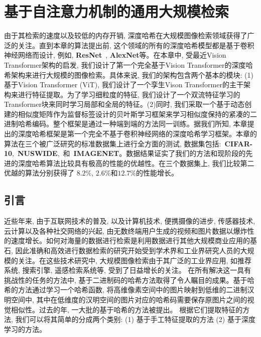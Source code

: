 \chapter{基于自注意力机制的通用大规模检索}
由于其检索的速度以及较低的内存开销, 深度哈希在大规模图像检索领域获得了广泛的关注。直到本章的算法提出前, 这个领域的所有的深度哈希模型都是基于卷积神经网络而设计, 例如, \textbf{ResNet}~\cite{he2016deep}, \textbf{AlexNet}等。在本章中, 受最近Vision Transformer架构的启发, 我们设计了第一个完全基于Vision Transformer的深度哈希架构来进行大规模的图像检索。具体来说, 我们的架构包含两个基本的模块: (1) 基于Vision Transformer (ViT), 我们设计了一个孪生Vison Transformer的主干架构来进行特征提取。为了学习细粒度的特征, 我们设计了一个双流特征学习的Transformer块来同时学习局部和全局的特征。(2)同时, 我们采取一个基于动态创建的相似度矩阵作为监督标签设计的贝叶斯学习框架来学习相似度保持的紧凑的二进制哈希编码。整个框架是通过一种端到端的方法同一训练。据我们所知, 本章提出的深度哈希框架是第一个完全不基于卷积神经网络的深度哈希学习框架。本章的算法在三个被广泛研究的标准数据集上进行全方面的测试, 数据集包括:~\textbf{CIFAR-10},~\textbf{NUSWIDE},~和~\textbf{IMAGENET}。数据结果证实了我们的方法和现阶段的先进的深度哈希算法比较具有极高的性能的优越性。在三个数据集上, 我们比较第二优越的算法分别获得了 $8.2\%$, $2.6 \%$和$12.7\%$的性能增长。

\section{引言}
近些年来, 由于互联网技术的普及, 以及计算机技术, 便携摄像的进步, 传感器技术, 云计算以及各种社交网络的兴起, 由无数终端用户生成的视频和图片数据以爆炸性的速度增长。如何对海量的数据进行检索是利用数据进行其他大规模商业应用的基石, 因此准确和高效进行数据检索的研究开始受到学术界和工业界研究人员的大规模的关注。在这些技术研究中, 大规模图像检索由于其广泛的工业界应用, 如推荐系统, 搜索引擎, 遥感检索系统等, 受到了日益增长的关注。 在所有解决这一具有挑战性的任务的方法中\cite{fu2017fast, ge2013optimized, jegou2010product, malkov2018efficient}, 基于二进制码的哈希方法取得了令人瞩目的成果。基于哈希的方法通过学习一个哈希函数, 将高维像素空间中的图片映射到低维的二进制汉明空间中, 其中在低维度的汉明空间的图片对应的哈希码需要保存原图片之间的视觉相似性。过去的年, 一大批的基于哈希的方法被提出。 根据它们提取特征的方法, 我们可以将其简单的分成两个类别: (1) 基于手工特征提取的方法 (2) 基于深度学习的方法。\par

